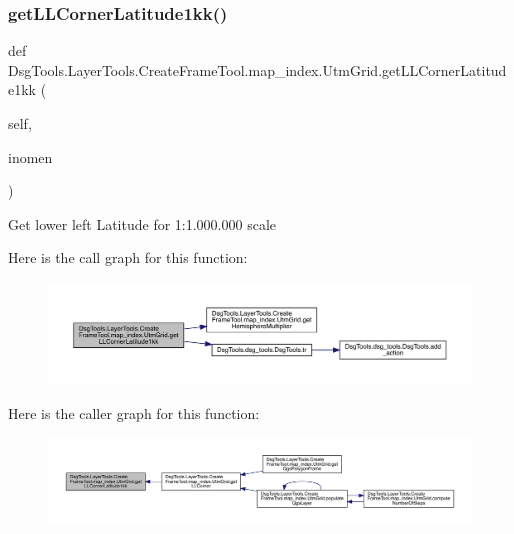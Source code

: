 \subsubsection{\texorpdfstring{get\+L\+L\+Corner\+Latitude1kk()}{getLLCornerLatitude1kk()}}
{\footnotesize\ttfamily def Dsg\+Tools.\+Layer\+Tools.\+Create\+Frame\+Tool.\+map\+\_\+index.\+Utm\+Grid.\+get\+L\+L\+Corner\+Latitude1kk (\begin{DoxyParamCaption}\item[{}]{self,  }\item[{}]{inomen }\end{DoxyParamCaption})}

\begin{DoxyVerb}Get lower left Latitude for 1:1.000.000 scale
\end{DoxyVerb}
 Here is the call graph for this function\+:
\nopagebreak
\begin{figure}[H]
\begin{center}
\leavevmode
\includegraphics[width=350pt]{class_dsg_tools_1_1_layer_tools_1_1_create_frame_tool_1_1map__index_1_1_utm_grid_aecd1f1dd22ac5ca3ceb9b2ae70d94130_cgraph}
\end{center}
\end{figure}
Here is the caller graph for this function\+:
\nopagebreak
\begin{figure}[H]
\begin{center}
\leavevmode
\includegraphics[width=350pt]{class_dsg_tools_1_1_layer_tools_1_1_create_frame_tool_1_1map__index_1_1_utm_grid_aecd1f1dd22ac5ca3ceb9b2ae70d94130_icgraph}
\end{center}
\end{figure}
\mbox{\label{class_dsg_tools_1_1_layer_tools_1_1_create_frame_tool_1_1map__index_1_1_utm_grid_a1dec1fb206868831867092648f542713}} 
